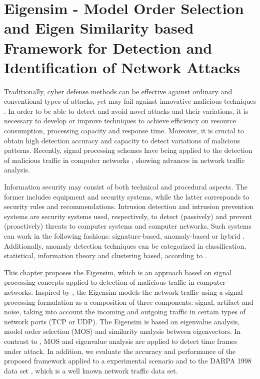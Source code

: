 \chapter{Eigensim - Model Order Selection and Eigen Similarity based Framework for Detection and Identification of Network Attacks}
\label{ch:2_mos_eig_sim}

Traditionally, cyber defense methods can be effective against ordinary and conventional types of attacks, yet may fail against innovative malicious techniques \cite{lakhina2005mining}. In order to be able to detect and avoid novel attacks and their variations, it is necessary to develop or improve techniques to achieve efficiency on resource consumption, processing capacity and response time. Moreover, it is crucial to obtain high detection accuracy and capacity to detect variations of malicious patterns. Recently, signal processing schemes have being applied to the detection of malicious traffic in computer networks \cite{Lu2009,Huang2009,Zonglin2009,david2011blind,da2012improved,tenorio2013greatest}, showing advances in network traffic analysis.

Information security may consist of both technical and procedural aspects. The former includes equipment and security systems, while the latter corresponds to security rules and recommendations. Intrusion detection and intrusion prevention systems are security systems used, respectively, to detect (passively) and prevent (proactively) threats to computer systems and computer networks. Such systems can work in the following fashions: signature-based, anomaly-based or hybrid \cite{Huang2009,mudzingwa2012study}. Additionally, anomaly detection techniques can be categorized in classification, statistical, information theory and clustering based, according to \cite{bhuyan2014network,ahmed2016survey,osanaiye2016distributed}.

This chapter proposes the Eigensim, which is an approach based on signal processing concepts applied to detection of malicious traffic in computer networks. Inspired by \cite{david2011blind,da2012improved}, the Eigensim models the network traffic using a signal processing formulation as a composition of three components: signal, artifact and noise, taking into account the incoming and outgoing traffic in certain types of network ports (TCP or UDP). The Eigensim is based on eigenvalue analysis, model order selection (MOS) and similarity analysis between eigenvectors. In contrast to \cite{david2011blind,da2012improved,tenorio2013greatest}, MOS and eigenvalue analysis are applied to detect time frames under attack. In addition, we evaluate the accuracy and performance of the proposed framework applied to a experimental scenario and to the DARPA 1998 data set \citep{osanaiye2016distributed}, which is a well known network traffic data set. 

